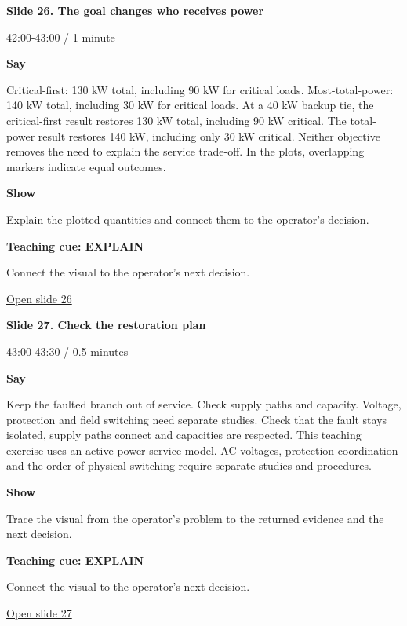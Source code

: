 \documentclass[12pt,letterpaper]{article}
\begin{document}
\clearpage{}
{\Large\bfseries\color{IEEEBlue} Slide 26. The goal changes who receives power\par}\medskip
{\small\color{Slate} 42:00-43:00 /\allowbreak{} 1 minute\par}\medskip
\textbf{Say}\par Critical-first: 130 kW total, including 90 kW for critical loads. Most-total-power: 140 kW total, including 30 kW for critical loads. At a 40 kW backup tie, the critical-first result restores 130 kW total, including 90 kW critical. The total-power result restores 140 kW, including only 30 kW critical. Neither objective removes the need to explain the service trade-off. In the plots, overlapping markers indicate equal outcomes.\par\medskip
\textbf{Show}\par Explain the plotted quantities and connect them to the operator's decision.\par\medskip
\textbf{Teaching cue: EXPLAIN}\par Connect the visual to the operator's next decision.\par\medskip
\vfill\href{https://alaaselim-sudo.github.io/GridGuard-Agentic-AI-Tutorials/operator-cases/#/26}{Open slide 26}\par
\clearpage{}
{\Large\bfseries\color{IEEEBlue} Slide 27. Check the restoration plan\par}\medskip
{\small\color{Slate} 43:00-43:30 /\allowbreak{} 0.5 minutes\par}\medskip
\textbf{Say}\par Keep the faulted branch out of service. Check supply paths and capacity. Voltage, protection and field switching need separate studies. Check that the fault stays isolated, supply paths connect and capacities are respected. This teaching exercise uses an active-power service model. AC voltages, protection coordination and the order of physical switching require separate studies and procedures.\par\medskip
\textbf{Show}\par Trace the visual from the operator's problem to the returned evidence and the next decision.\par\medskip
\textbf{Teaching cue: EXPLAIN}\par Connect the visual to the operator's next decision.\par\medskip
\vfill\href{https://alaaselim-sudo.github.io/GridGuard-Agentic-AI-Tutorials/operator-cases/#/27}{Open slide 27}\par
\end{document}
